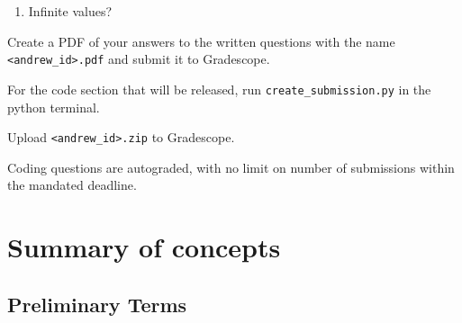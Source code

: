 \documentclass{16384_doc}
\begin{document}
\begin{questions}
\begin{enumerate} [label=\alph*.]
        \item \text{[4 points]} Infinite values?
        \begin{tcolorbox}[height=3cm]
        \end{tcolorbox}

            
    \end{enumerate}

    

\end{questions}

\begin{submissionChecklist}
		\item Create a PDF of your answers to the written questions with the name \verb!<andrew_id>.pdf! and submit it to Gradescope.
       	\item For the code section that will be released, run \verb!create_submission.py! in the python terminal.
       	\item Upload \verb!<andrew_id>.zip! to Gradescope.
        \item Coding questions are autograded, with no limit on number of submissions within the mandated deadline.
 
	\end{submissionChecklist}

 \newpage
 \section{Summary of concepts}

 \subsection{Preliminary Terms}


\end{document}
